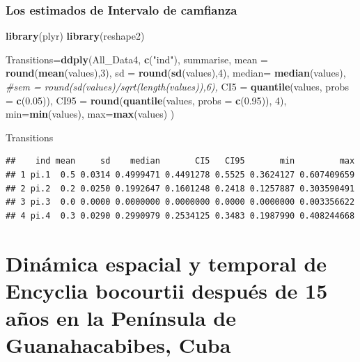 \documentclass[
]{book}
\newenvironment{Shaded}{\begin{snugshade}}{\end{snugshade}}
\newcommand{\AttributeTok}[1]{\textcolor[rgb]{0.13,0.29,0.53}{#1}}
\newcommand{\CommentTok}[1]{\textcolor[rgb]{0.56,0.35,0.01}{\textit{#1}}}
\newcommand{\DecValTok}[1]{\textcolor[rgb]{0.00,0.00,0.81}{#1}}
\newcommand{\FloatTok}[1]{\textcolor[rgb]{0.00,0.00,0.81}{#1}}
\newcommand{\FunctionTok}[1]{\textcolor[rgb]{0.13,0.29,0.53}{\textbf{#1}}}
\newcommand{\NormalTok}[1]{#1}
\newcommand{\OtherTok}[1]{\textcolor[rgb]{0.56,0.35,0.01}{#1}}
\newcommand{\StringTok}[1]{\textcolor[rgb]{0.31,0.60,0.02}{#1}}
\theoremstyle{definition}
\theoremstyle{definition}
\theoremstyle{definition}
\theoremstyle{definition}
\theoremstyle{remark}
\begin{document}
\subsection{Los estimados de Intervalo de camfianza}\label{los-estimados-de-intervalo-de-camfianza}

\begin{Shaded}
\begin{Highlighting}[]
\FunctionTok{library}\NormalTok{(plyr)}
\FunctionTok{library}\NormalTok{(reshape2)}

\NormalTok{Transitions}\OtherTok{=}\FunctionTok{ddply}\NormalTok{(All\_Data4, }\FunctionTok{c}\NormalTok{(}\StringTok{"ind"}\NormalTok{), summarise,}
            \AttributeTok{mean =} \FunctionTok{round}\NormalTok{(}\FunctionTok{mean}\NormalTok{(values),}\DecValTok{3}\NormalTok{), }\AttributeTok{sd =} \FunctionTok{round}\NormalTok{(}\FunctionTok{sd}\NormalTok{(values),}\DecValTok{4}\NormalTok{),}
            \AttributeTok{median=} \FunctionTok{median}\NormalTok{(values),}
            \CommentTok{\#sem = round(sd(values)/sqrt(length(values)),6),}
            \AttributeTok{CI5 =} \FunctionTok{quantile}\NormalTok{(values, }\AttributeTok{probs =} \FunctionTok{c}\NormalTok{(}\FloatTok{0.05}\NormalTok{)),}
            \AttributeTok{CI95 =} \FunctionTok{round}\NormalTok{(}\FunctionTok{quantile}\NormalTok{(values, }\AttributeTok{probs =} \FunctionTok{c}\NormalTok{(}\FloatTok{0.95}\NormalTok{)), }\DecValTok{4}\NormalTok{),}
            \AttributeTok{min=}\FunctionTok{min}\NormalTok{(values),}
            \AttributeTok{max=}\FunctionTok{max}\NormalTok{(values)}
\NormalTok{            )}

\NormalTok{Transitions}
\end{Highlighting}
\end{Shaded}

\begin{verbatim}
##    ind mean     sd    median       CI5   CI95       min         max
## 1 pi.1  0.5 0.0314 0.4999471 0.4491278 0.5525 0.3624127 0.607409659
## 2 pi.2  0.2 0.0250 0.1992647 0.1601248 0.2418 0.1257887 0.303590491
## 3 pi.3  0.0 0.0000 0.0000000 0.0000000 0.0000 0.0000000 0.003356622
## 4 pi.4  0.3 0.0290 0.2990979 0.2534125 0.3483 0.1987990 0.408244668
\end{verbatim}

\chapter{Dinámica espacial y temporal de Encyclia bocourtii después de 15 años en la Península de Guanahacabibes, Cuba}\label{dinuxe1mica-espacial-y-temporal-de-encyclia-bocourtii-despuuxe9s-de-15-auxf1os-en-la-penuxednsula-de-guanahacabibes-cuba}
\end{document}
